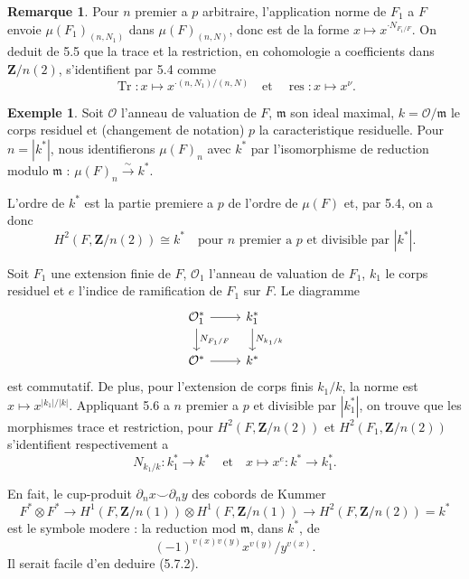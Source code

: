 \documentclass[11pt,a4paper]{article}
\theoremstyle{plain}
\theoremstyle{definition}
\newtheorem{example}[theorem]{Exemple}
\newtheorem{remark}[theorem]{Remarque}
\DeclareMathOperator{\res}{res}
\DeclareMathOperator{\Tr}{Tr}
\begin{document}
\begin{remark}\label{5.6}
Pour $n$ premier a $p$ arbitraire, l'application norme de $F_1$ a $F$ envoie $\mu(F_1)_{(n,N_1)}$ dans $\mu(F)_{(n,N)}$, donc est de la forme $x \mapsto x^{\cdot N_{F_1/F}}$. On deduit de 5.5 que la trace et la restriction, en cohomologie a coefficients dans $\mathbf{Z}/n(2)$, s'identifient par 5.4 comme
\[
\Tr : x \mapsto x^{\cdot (n,N_1)/(n,N)} \quad \text{et} \quad \res : x \mapsto x^{\nu}.
\]
\end{remark}

\begin{example}\label{5.7}
Soit $\mathcal{O}$ l'anneau de valuation de $F$, $\mathfrak{m}$ son ideal maximal, $k = \mathcal{O}/\mathfrak{m}$ le corps residuel et (changement de notation) $p$ la caracteristique residuelle. Pour $n = |k^*|$, nous identifierons $\mu(F)_n$ avec $k^*$ par l'isomorphisme de reduction modulo $\mathfrak{m}$ : $\mu(F)_n \xrightarrow{\sim} k^*$.

L'ordre de $k^*$ est la partie premiere a $p$ de l'ordre de $\mu(F)$ et, par 5.4, on a donc
\begin{equation}\label{5.7.1}
H^2(F, \mathbf{Z}/n(2)) \cong k^* \quad \text{pour } n \text{ premier a } p \text{ et divisible par } |k^*|.
\end{equation}

Soit $F_1$ une extension finie de $F$, $\mathcal{O}_1$ l'anneau de valuation de $F_1$, $k_1$ le corps residuel et $e$ l'indice de ramification de $F_1$ sur $F$. Le diagramme
\[
\begin{tikzcd}
\mathcal{O}_1^* \arrow{r} \arrow{d}{N_{F_1/F}} & k_1^* \arrow{d}{N_{k_1/k}} \\
\mathcal{O}^* \arrow{r} & k^*
\end{tikzcd}
\]
est commutatif. De plus, pour l'extension de corps finis $k_1/k$, la norme est $x \mapsto x^{|k_1|/|k|}$. Appliquant 5.6 a $n$ premier a $p$ et divisible par $|k_1^*|$, on trouve que les morphismes trace et restriction, pour $H^2(F, \mathbf{Z}/n(2))$ et $H^2(F_1, \mathbf{Z}/n(2))$ s'identifient respectivement a
\begin{equation}\label{5.7.2}
N_{k_1/k} : k_1^* \to k^* \quad \text{et} \quad x \mapsto x^e : k^* \to k_1^*.
\end{equation}

En fait, le cup-produit $\partial_n x \smile \partial_n y$ des cobords de Kummer
\[
F^* \otimes F^* \to H^1(F, \mathbf{Z}/n(1)) \otimes H^1(F, \mathbf{Z}/n(1)) \to H^2(F, \mathbf{Z}/n(2)) = k^*
\]
est le symbole modere : la reduction mod $\mathfrak{m}$, dans $k^*$, de
\[
(-1)^{v(x) v(y)} x^{v(y)} / y^{v(x)}.
\]
Il serait facile d'en deduire (5.7.2).
\end{example}
\end{document}
